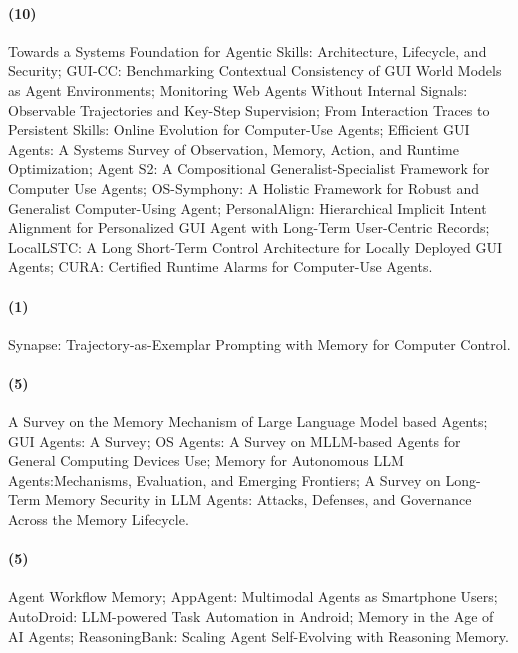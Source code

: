 \paragraph{ (10)}
Towards a Systems Foundation for Agentic Skills: Architecture, Lifecycle, and Security; GUI-CC: Benchmarking Contextual Consistency of GUI World Models as Agent Environments; Monitoring Web Agents Without Internal Signals: Observable Trajectories and Key-Step Supervision; From Interaction Traces to Persistent Skills: Online Evolution for Computer-Use Agents; Efficient GUI Agents: A Systems Survey of Observation, Memory, Action, and Runtime Optimization; Agent S2: A Compositional Generalist-Specialist Framework for Computer Use Agents; OS-Symphony: A Holistic Framework for Robust and Generalist Computer-Using Agent; PersonalAlign: Hierarchical Implicit Intent Alignment for Personalized GUI Agent with Long-Term User-Centric Records; LocalLSTC: A Long Short-Term Control Architecture for Locally Deployed GUI Agents; CURA: Certified Runtime Alarms for Computer-Use Agents.
\paragraph{ (1)}
Synapse: Trajectory-as-Exemplar Prompting with Memory for Computer Control.
\paragraph{ (5)}
A Survey on the Memory Mechanism of Large Language Model based Agents; GUI Agents: A Survey; OS Agents: A Survey on MLLM-based Agents for General Computing Devices Use; Memory for Autonomous LLM Agents:Mechanisms, Evaluation, and Emerging Frontiers; A Survey on Long-Term Memory Security in LLM Agents: Attacks, Defenses, and Governance Across the Memory Lifecycle.
\paragraph{ (5)}
Agent Workflow Memory; AppAgent: Multimodal Agents as Smartphone Users; AutoDroid: LLM-powered Task Automation in Android; Memory in the Age of AI Agents; ReasoningBank: Scaling Agent Self-Evolving with Reasoning Memory.
